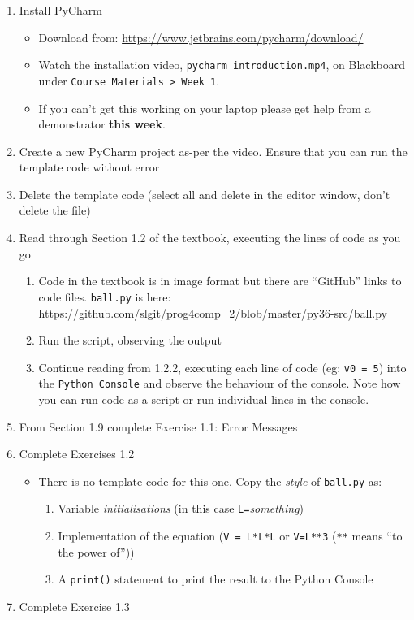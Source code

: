 \documentclass{lab}
\begin{document}
\begin{enumerate}
\item Install PyCharm
	\begin{itemize}
		\item Download from: \url{https://www.jetbrains.com/pycharm/download/}
		\item Watch the installation video, \texttt{pycharm introduction.mp4}, on Blackboard under \texttt{Course Materials > Week 1}.
		\item If you can't get this working on your laptop please get help from a demonstrator \textbf{this week}.
	\end{itemize}
\item Create a new PyCharm project as-per the video. Ensure that you can run the template code without error
\item Delete the template code (select all and delete in the editor window, don't delete the file)
\item Read through Section 1.2 of the textbook, executing the lines of code as you go
	\begin{enumerate}
		\item Code in the textbook is in image format but there are ``GitHub'' links to code files. \texttt{ball.py} is here: \url{https://github.com/slgit/prog4comp_2/blob/master/py36-src/ball.py}
		\item Run the script, observing the output
		\item Continue reading from 1.2.2, executing each line of code (eg: \texttt{v0 = 5}) into the \texttt{Python Console} and observe the behaviour of the console. Note how you can run code as a script or run individual lines in the console.
	\end{enumerate}
\item From Section 1.9 complete Exercise 1.1: Error Messages
\item Complete Exercises 1.2
	\begin{itemize}
		\item There is no template code for this one. Copy the \textit{style} of \texttt{ball.py} as:
			\begin{enumerate}
				\item Variable \textit{initialisations} (in this case \texttt{L=}\textit{something})
				\item Implementation of the equation (\texttt{V = L*L*L} or \texttt{V=L**3} (\texttt{**} means ``to the power of''))
				\item A \texttt{print()} statement to print the result to the Python Console
			\end{enumerate}
	\end{itemize}
\item Complete Exercise 1.3
\end{enumerate}
\end{document}
